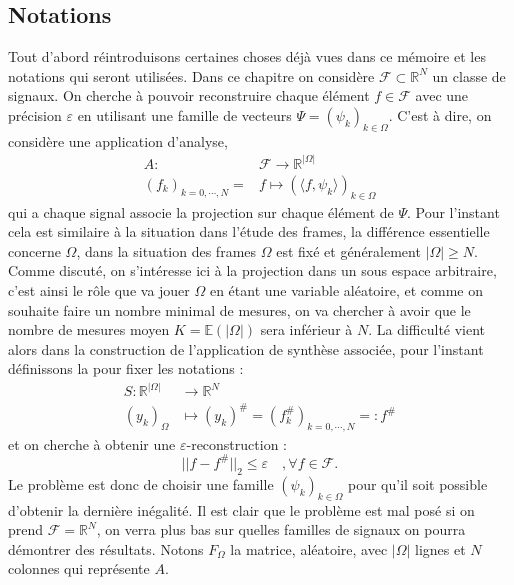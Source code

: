 \subsection{Notations}
Tout d'abord réintroduisons certaines choses déjà vues dans ce mémoire et les notations qui seront utilisées.
Dans ce chapitre on considère $\mathcal{F} \subset \mathbb{R}^N$ un classe de signaux.
On cherche à pouvoir reconstruire chaque élément $f\in \mathcal{F}$ avec une précision $\varepsilon$ en utilisant une famille de vecteurs $\Psi=(\psi_k)_{k \in \Omega}$.
\newline
C'est à dire, on considère une application d'analyse,
\begin{align}
	A : 	&\mathcal{F} \longrightarrow \mathbb{R}^{|\Omega|}\\
	(f_k)_{k = 0, \cdots, N} = &f \longmapsto (\langle f, \psi_k \rangle )_{k\in \Omega}
\end{align}
qui a chaque signal associe la projection sur chaque élément de $\Psi$.
Pour l'instant cela est similaire à la situation dans l'étude des frames, la différence essentielle concerne $\Omega$, dans la situation des frames $\Omega$ est fixé et généralement $|\Omega| \geq N$.
Comme discuté, on s'intéresse ici à la projection dans un sous espace arbitraire, c'est ainsi le rôle que va jouer $\Omega$ en étant une variable aléatoire, et comme on souhaite faire un nombre minimal de mesures, on va chercher à avoir que le nombre de mesures moyen $K = \mathbb{E}(|\Omega|)$ sera inférieur à $N$.
La difficulté vient alors dans la construction de l'application de synthèse associée, pour l'instant définissons la pour fixer les notations :
\begin{align}
	S: \mathbb{R}^{|\Omega|} &\longrightarrow \mathbb{R}^N \\
	(y_k)_\Omega &\longmapsto (y_k)^\# = (f_k ^\#)_{k = 0, \cdots, N} =: f^\#
\end{align}
et on cherche à obtenir une $\varepsilon$-reconstruction :
\begin{equation}
	|| f- f^\#||_2 \leq \varepsilon \quad, \forall f \in \mathcal{F}. 
\end{equation}
Le problème est donc de choisir une famille $(\psi_k)_{k \in \Omega}$ pour qu'il soit possible d'obtenir la dernière inégalité.
Il est clair que le problème est mal posé si on prend $\mathcal{F} = \mathbb{R}^N$, on verra plus bas sur quelles familles de signaux on pourra démontrer des résultats.
\newline
Notons $F_\Omega$ la matrice, aléatoire, avec $|\Omega|$ lignes et $N$ colonnes qui représente $A$.

